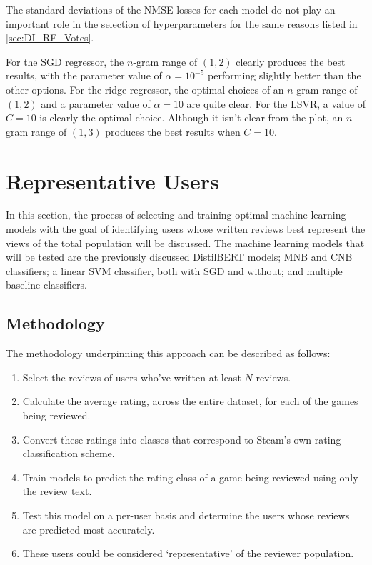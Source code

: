 The standard deviations of the NMSE losses for each model do not play an important role in the selection of hyperparameters for the same reasons listed in \ref{sec:DI_RF_Votes}.

For the SGD regressor, the $n$-gram range of $(1, 2)$ clearly produces the best results, with the parameter value of $\alpha=10^{-5}$ performing slightly better than the other options. For the ridge regressor, the optimal choices of an $n$-gram range of $(1, 2)$ and a parameter value of $\alpha=10$ are quite clear. For the LSVR, a value of $C=10$ is clearly the optimal choice. Although it isn't clear from the plot, an $n$-gram range of $(1, 3)$ produces the best results when $C=10$.

\section{Representative Users} \label{sec:DI_RU}

In this section, the process of selecting and training optimal machine learning models with the goal of identifying users whose written reviews best represent the views of the total population will be discussed. The machine learning models that will be tested are the previously discussed DistilBERT models; MNB and CNB classifiers; a linear SVM classifier, both with SGD and without; and multiple baseline classifiers.

\subsection{Methodology}

The methodology underpinning this approach can be described as follows:

\begin{enumerate}
    \item Select the reviews of users who've written at least $N$ reviews.
    \item Calculate the average rating, across the entire dataset, for each of the games being reviewed.
    \item Convert these ratings into classes that correspond to Steam's own rating classification scheme.
    \item Train models to predict the rating class of a game being reviewed using only the review text.
    \item Test this model on a per-user basis and determine the users whose reviews are predicted most accurately.
    \item These users could be considered `representative' of the reviewer population.
\end{enumerate}

